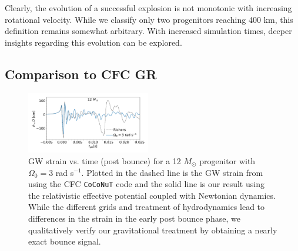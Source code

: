 \documentclass[twocolumn,times]{aastex62}  %
\begin{document}
Clearly, the evolution of a successful explosion is not monotonic with increasing rotational velocity.  While we classify only two progenitors reaching 400 km, this definition remains somewhat arbitrary.  With increased simulation times, deeper insights regarding this evolution can be explored.


\subsection{Comparison to CFC GR}

 \begin{figure}[t]
    \centering
    \includegraphics[width=0.48\textwidth]{figures/bounce_richers.pdf}
    \caption{GW strain vs. time (post bounce) for a 12 \(M_\odot\) progenitor with $\Omega_0 = 3$ rad s$^{-1}$.  Plotted in the dashed line is the GW strain from \citet{richers:2017} using the CFC \texttt{CoCoNuT} code and the solid line is our result using the relativistic effective potential coupled with Newtonian dynamics.  While the different grids and treatment of hydrodynamics lead to differences in the strain in the early post bounce phase, we qualitatively verify our gravitational treatment by obtaining a nearly exact bounce signal. }
    \label{fig:bounce_cfc}
\end{figure}
\end{document}
